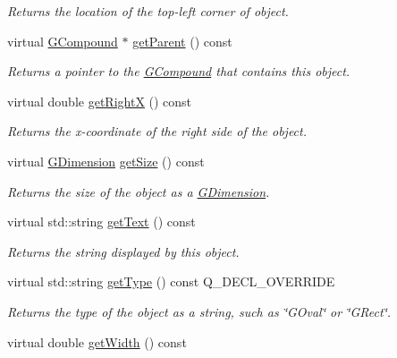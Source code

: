 \begin{DoxyCompactItemize}
\begin{DoxyCompactList}\small\item\em Returns the location of the top-\/left corner of object. \end{DoxyCompactList}\item 
virtual \mbox{\hyperlink{classGCompound}{G\+Compound}} $\ast$ \mbox{\hyperlink{classGObject_a3e53cef70541b1a14eade4ad0984d0b4}{get\+Parent}} () const
\begin{DoxyCompactList}\small\item\em Returns a pointer to the {\ttfamily \mbox{\hyperlink{classGCompound}{G\+Compound}}} that contains this object. \end{DoxyCompactList}\item 
virtual double \mbox{\hyperlink{classGObject_a798cc79daaa10145b28f60bcdfdb0ee9}{get\+RightX}} () const
\begin{DoxyCompactList}\small\item\em Returns the {\itshape x}-\/coordinate of the right side of the object. \end{DoxyCompactList}\item 
virtual \mbox{\hyperlink{classGDimension}{G\+Dimension}} \mbox{\hyperlink{classGObject_a7b4eec96a2bdc6420695d5796a78eea9}{get\+Size}} () const
\begin{DoxyCompactList}\small\item\em Returns the size of the object as a {\ttfamily \mbox{\hyperlink{classGDimension}{G\+Dimension}}}. \end{DoxyCompactList}\item 
virtual std\+::string \mbox{\hyperlink{classGText_aff553c50924b836c29f146ed34a7c6ec}{get\+Text}} () const
\begin{DoxyCompactList}\small\item\em Returns the string displayed by this object. \end{DoxyCompactList}\item 
virtual std\+::string \mbox{\hyperlink{classGText_a9896d58fcfebbf1025aeeb5b8b9ede80}{get\+Type}} () const Q\+\_\+\+D\+E\+C\+L\+\_\+\+O\+V\+E\+R\+R\+I\+DE
\begin{DoxyCompactList}\small\item\em Returns the type of the object as a string, such as {\ttfamily \char`\"{}\+G\+Oval\char`\"{}} or {\ttfamily \char`\"{}\+G\+Rect\char`\"{}}. \end{DoxyCompactList}\item 
virtual double \mbox{\hyperlink{classGObject_a0ed2965abd4f5701d2cadf71239faf19}{get\+Width}} () const

\end{DoxyCompactItemize}
